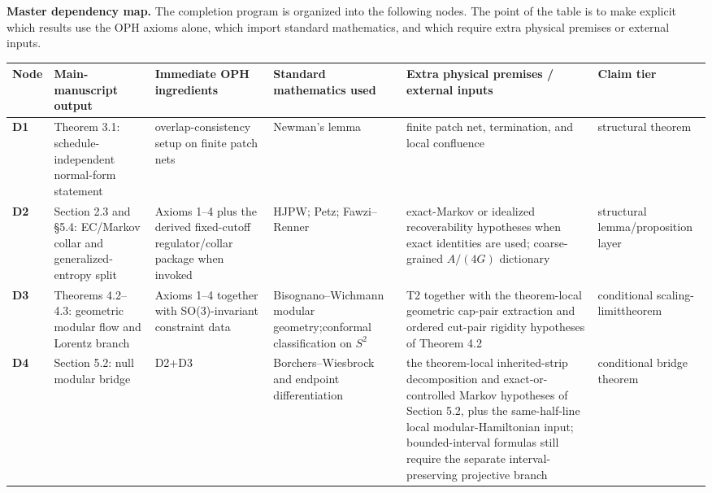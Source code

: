 \textbf{Master dependency map.} The completion program is organized into the following nodes. The point of the table is to make explicit which results use the OPH axioms alone, which import standard mathematics, and which require extra physical premises or external inputs.

\begingroup
\scriptsize
{\def\LTcaptype{none}
\setlength{\tabcolsep}{1pt}
\begin{longtable}[]{@{}>{\RaggedRight\arraybackslash}p{}>{\RaggedRight\arraybackslash}p{}>{\RaggedRight\arraybackslash}p{}>{\RaggedRight\arraybackslash}p{}>{\RaggedRight\arraybackslash}p{}>{\RaggedRight\arraybackslash}p{}@{}}
\toprule\noalign{}
Node & Main-manuscript output & Immediate OPH ingredients & Standard mathematics used & Extra physical premises / external inputs & Claim tier \\
\midrule\noalign{}
\endhead
\bottomrule\noalign{}
\endlastfoot
\textbf{D1} & Theorem 3.1: schedule-independent normal-form statement & overlap-consistency setup on finite patch nets & Newman's lemma & finite patch net, termination, and local confluence & structural theorem \\
\textbf{D2} & Section 2.3 and \S5.4: EC/Markov collar and generalized-entropy split & Axioms 1--4 plus the derived fixed-cutoff regulator/collar package when invoked & HJPW; Petz; Fawzi--Renner & exact-Markov or idealized recoverability hypotheses when exact identities are used; coarse-grained \(A/(4G)\) dictionary & structural lemma/\newline proposition layer \\
\textbf{D3} & Theorems 4.2--4.3: geometric modular flow and Lorentz branch & Axioms 1--4 together with SO(3)-invariant constraint data & Bisognano--Wichmann modular geometry;\newline conformal classification on \(S^2\) & T2 together with the theorem-local geometric cap-pair extraction and ordered cut-pair rigidity hypotheses of Theorem 4.2 & conditional scaling-limit\newline theorem \\
\textbf{D4} & Section 5.2: null modular bridge & D2+D3 & Borchers--Wiesbrock and endpoint differentiation & the theorem-local inherited-strip decomposition and exact-or-controlled Markov hypotheses of Section 5.2, plus the same-half-line local modular-Hamiltonian input; bounded-interval formulas still require the separate interval-preserving projective branch & conditional bridge theorem \\

\end{longtable}}
